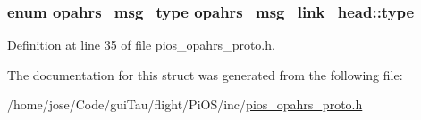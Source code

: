 \hypertarget{structopahrs__msg__link__head_a2ef0c8a3460a335147b3092e1897be73}{
\subsubsection[{type}]{\setlength{\rightskip}{0pt plus 5cm}enum {\bf opahrs\-\_\-msg\-\_\-type} opahrs\-\_\-msg\-\_\-link\-\_\-head\-::type}}\label{structopahrs__msg__link__head_a2ef0c8a3460a335147b3092e1897be73}


Definition at line 35 of file pios\-\_\-opahrs\-\_\-proto.\-h.



The documentation for this struct was generated from the following file\-:\begin{DoxyCompactItemize}
\item 
/home/jose/\-Code/gui\-Tau/flight/\-Pi\-O\-S/inc/\hyperlink{pios__opahrs__proto_8h}{pios\-\_\-opahrs\-\_\-proto.\-h}\end{DoxyCompactItemize}
